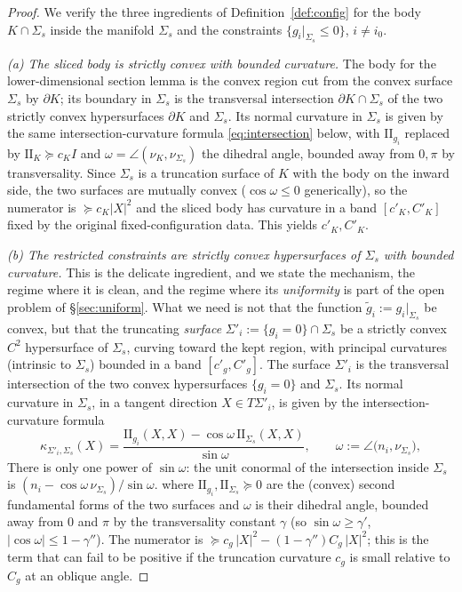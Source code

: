 \documentclass[11pt]{article}
\begin{document}
\begin{proof}
We verify the three ingredients of Definition~\ref{def:config} for the body
$K\cap\Sigma_s$ inside the manifold $\Sigma_s$ and the constraints
$\{g_i|_{\Sigma_s}\le0\}$, $i\ne i_0$.

\emph{(a) The sliced body is strictly convex with bounded curvature.}  The body
for the lower-dimensional section lemma is the convex region cut from the convex
surface $\Sigma_s$ by $\partial K$; its boundary in $\Sigma_s$ is the
transversal intersection $\partial K\cap\Sigma_s$ of the two strictly convex
hypersurfaces $\partial K$ and $\Sigma_s$.  Its normal curvature in $\Sigma_s$
is given by the same intersection-curvature formula \eqref{eq:intersection}
below, with $\mathrm{I\!I}_{g_i}$ replaced by $\mathrm{I\!I}_K\succeq c_KI$ and
$\omega=\angle(\nu_K,\nu_{\Sigma_s})$ the dihedral angle, bounded away from
$0,\pi$ by transversality.  Since $\Sigma_s$ is a truncation surface of $K$ with
the body on the inward side, the two surfaces are mutually convex
($\cos\omega\le0$ generically), so the numerator is $\succeq c_K|X|^2$ and the
sliced body has curvature in a band $[c'_K,C'_K]$ fixed by the original
fixed-configuration data.  This yields $c'_K,C'_K$.

\emph{(b) The restricted constraints are strictly convex hypersurfaces of
$\Sigma_s$ with bounded curvature.}  This is the delicate ingredient, and we
state the mechanism, the regime where it is clean, and the regime where its
\emph{uniformity} is part of the open problem of \S\ref{sec:uniform}.  What we
need is not that the function $\tilde g_i:=g_i|_{\Sigma_s}$ be convex, but that
the truncating \emph{surface} $\Sigma'_i:=\{g_i=0\}\cap\Sigma_s$ be a strictly
convex $C^2$ hypersurface of $\Sigma_s$, curving toward the kept region, with
principal curvatures (intrinsic to $\Sigma_s$) bounded in a band $[c'_g,C'_g]$.
The surface $\Sigma'_i$ is the transversal intersection of the two convex
hypersurfaces $\{g_i=0\}$ and $\Sigma_s$.  Its normal curvature in $\Sigma_s$,
in a tangent direction $X\in T\Sigma'_i$, is given by the intersection-curvature
formula
\begin{equation}\label{eq:intersection}
\kappa_{\Sigma'_i,\Sigma_s}(X)
=\frac{\mathrm{I\!I}_{g_i}(X,X)-\cos\omega\,\mathrm{I\!I}_{\Sigma_s}(X,X)}{\sin\omega},
\qquad\omega:=\angle\bigl(n_i,\nu_{\Sigma_s}\bigr),
\end{equation}
There is only one power of \(\sin\omega\): the unit conormal of the intersection
inside \(\Sigma_s\) is \((n_i-\cos\omega\,\nu_{\Sigma_s})/\sin\omega\).
where $\mathrm{I\!I}_{g_i},\mathrm{I\!I}_{\Sigma_s}\succeq0$ are the (convex)
second fundamental forms of the two surfaces and $\omega$ is their dihedral
angle, bounded away from $0$ and $\pi$ by the transversality constant
$\gamma$ (so $\sin\omega\ge\gamma'$, $|\cos\omega|\le1-\gamma''$).  The numerator
is $\succeq c_g\,|X|^2-(1-\gamma'')C_g\,|X|^2$; this is the term that can fail to
be positive if the truncation curvature $c_g$ is small relative to $C_g$ at an
oblique angle.


\end{proof}
\end{document}

